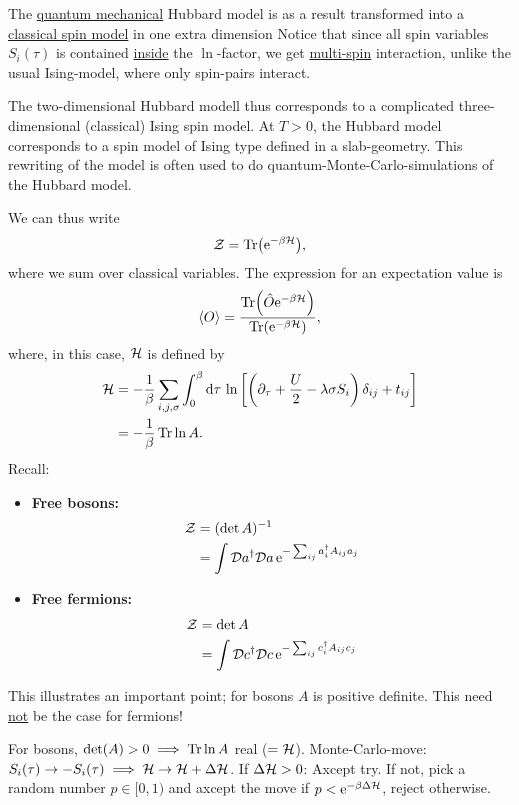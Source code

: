 The \underline{quantum mechanical} Hubbard model is as a result transformed into a \underline{classical spin model} in one extra dimension
Notice that since all spin variables \(S_i(\tau)\) is contained \underline{inside} the \(\ln\)-factor, we get \underline{multi-spin} interaction, unlike the usual Ising-model, where only spin-pairs interact.

The two-dimensional Hubbard modell thus corresponds to a complicated three-dimensional (classical) Ising spin model. At \(T>0\), the Hubbard model corresponds to a spin model of Ising type defined in a slab-geometry. 
This rewriting of the model is often used to do quantum-Monte-Carlo-simulations of the Hubbard model.

We can thus write 
\begin{equation}
\mathcal{Z} = \Tr(\mathrm{e}^{-\beta \mathcal{H}}),
\end{equation}
where we sum over classical variables. The expression for an expectation value is
\begin{equation}
\ev{O} = \frac{\Tr(\hat{O}\e^{-\beta\Ha})}{\Tr(\e^{-\beta\Ha})},
\end{equation}
where, in this case, \(\mathcal{H}\) is defined by
\begin{align}
\begin{split}\mathcal{H} &= -\frac1\beta\sum_{i,j,\sigma}\int_0^\beta\dd\tau\,\ln\left[\left(\partial_{\tau}+\frac U2-\lambda\sigma S_i\right)\delta_{ij}+t_{ij}\right] \\&= -\frac1\beta \Tr\ln A.
\end{split}
\end{align}
Recall:
\begin{itemize}
\item \textbf{Free bosons:}
\begin{align*}
\mathcal{Z} &= (\det A)^{-1} \\
&= \int\mathcal{D} a^\dagger\mathcal{D} a\,\mathrm{e}^{-\sum_{ij}a_i^\dagger A_{ij}a_j}
\end{align*}
\item \textbf{Free fermions:}
\begin{align*}
\mathcal{Z} &= \det A \\
&= \int\mathcal{D} c^\dagger\mathcal{D} c\,\mathrm{e}^{-\sum_{ij}c_i^\dagger A_{ij}c_j}
\end{align*}
\end{itemize}
This illustrates an important point; for bosons $A$ is positive definite. This need \underline{not} be the case for fermions!

For bosons, \(\det(A)>0\implies\Tr\ln A\) real (\(=\mathcal{H}\)). Monte-Carlo-move: \(S_i(\tau)\rightarrow -S_i(\tau) \implies \mathcal{H}\rightarrow \mathcal{H} + \Delta\mathcal{H}\). If \(\Delta\mathcal{H}>0\): Axcept try. If not, pick a random number \(p\in [0,1)\) and axcept the move if \(p<\mathrm{e}^{-\beta\Delta\mathcal{H}}\), reject otherwise.

